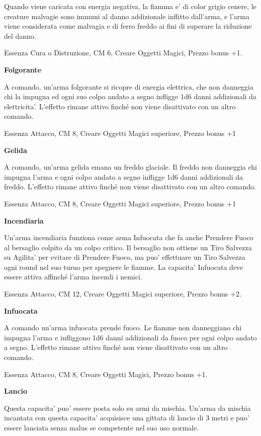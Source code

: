 \documentclass[a4paper,11pt,twoside,openany]{book}
\begin{document}
{		Quando viene caricata con energia negativa, la fiamma e' di color grigio cenere, le creature malvagie sono immuni al danno addizionale inflitto dall'arma, e l'arma viene considerata come malvagia e di ferro freddo ai fini di superare la riduzione del danno.
		
		Essenza Cura o Distruzione, CM 6, Creare Oggetti Magici, Prezzo bonus +1.
		
		\textbf{Folgorante}
		
		A comando, un'arma folgorante si ricopre di energia elettrica, che non danneggia chi la impugna ed ogni suo colpo andato a segno infligge 1d6 danni addizionali da elettricita'. L'effetto rimane attivo finché non viene disattivato con un altro comando.
		
		Essenza Attacco, CM 8, Creare Oggetti Magici superiore, Prezzo bonus +1
		
		\textbf{Gelida}
		
		A comando, un'arma gelida emana un freddo glaciale. Il freddo non danneggia chi impugna l'arma e ogni colpo andato a segno infligge 1d6 danni addizionali da freddo. L'effetto rimane attivo finché non viene disattivato con un altro comando.
		
		Essenza Attacco, CM 8, Creare Oggetti Magici superiore, Prezzo bonus +1
		
		\textbf{Incendiaria}
		
		Un'arma incendiaria funziona come arma Infuocata che fa anche Prendere Fuoco al bersaglio colpito da un colpo critico. Il bersaglio non ottiene un Tiro Salvezza su Agilita' per evitare di Prendere Fuoco, ma puo' effettuare un Tiro Salvezza ogni round nel suo turno per spegnere le fiamme. La capacita' Infuocata deve essere attiva affinché l'arma incendi i nemici.
		
		Essenza Attacco, CM 12, Creare Oggetti Magici superiore, Prezzo bonus +2.
		
		\textbf{Infuocata}
		
		A comando un'arma infuocata prende fuoco. Le fiamme non danneggiano chi impugna l'arma e infliggono 1d6 danni addizionali da fuoco per ogni colpo andato a segno. L'effetto rimane attivo finché non viene disattivato con un altro comando.
		
		Essenza Attacco, CM 8, Creare Oggetti Magici, Prezzo bonus +1.
		
		\textbf{Lancio}
		
		Questa capacita' puo' essere posta solo su armi da mischia. Un'arma da mischia incantata con questa capacita' acquisisce una gittata di lancio di 3 metri e puo' essere lanciata senza malus se competente nel suo uso normale.
		
}
\end{document}
